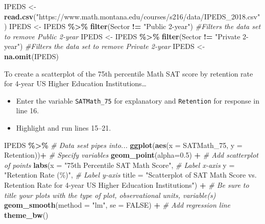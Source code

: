 \documentclass[
]{report}
\newenvironment{Shaded}{\begin{snugshade}}{\end{snugshade}}
\newcommand{\AttributeTok}[1]{\textcolor[rgb]{0.13,0.29,0.53}{#1}}
\newcommand{\CommentTok}[1]{\textcolor[rgb]{0.56,0.35,0.01}{\textit{#1}}}
\newcommand{\ConstantTok}[1]{\textcolor[rgb]{0.56,0.35,0.01}{#1}}
\newcommand{\FloatTok}[1]{\textcolor[rgb]{0.00,0.00,0.81}{#1}}
\newcommand{\FunctionTok}[1]{\textcolor[rgb]{0.13,0.29,0.53}{\textbf{#1}}}
\newcommand{\NormalTok}[1]{#1}
\newcommand{\OtherTok}[1]{\textcolor[rgb]{0.56,0.35,0.01}{#1}}
\newcommand{\SpecialCharTok}[1]{\textcolor[rgb]{0.81,0.36,0.00}{\textbf{#1}}}
\newcommand{\StringTok}[1]{\textcolor[rgb]{0.31,0.60,0.02}{#1}}
\begin{document}
\begin{Shaded}
\begin{Highlighting}[]
\NormalTok{IPEDS }\OtherTok{\textless{}{-}} \FunctionTok{read.csv}\NormalTok{(}\StringTok{"https://www.math.montana.edu/courses/s216/data/IPEDS\_2018.csv"}\NormalTok{) }
\NormalTok{IPEDS }\OtherTok{\textless{}{-}}\NormalTok{ IPEDS }\SpecialCharTok{\%\textgreater{}\%}
  \FunctionTok{filter}\NormalTok{(Sector }\SpecialCharTok{!=} \StringTok{"Public 2{-}year"}\NormalTok{) }\CommentTok{\#Filters the data set to remove Public 2{-}year}
\NormalTok{IPEDS }\OtherTok{\textless{}{-}}\NormalTok{ IPEDS }\SpecialCharTok{\%\textgreater{}\%}
  \FunctionTok{filter}\NormalTok{(Sector }\SpecialCharTok{!=} \StringTok{"Private 2{-}year"}\NormalTok{) }\CommentTok{\#Filters the data set to remove Private 2{-}year}
\NormalTok{IPEDS }\OtherTok{\textless{}{-}} \FunctionTok{na.omit}\NormalTok{(IPEDS)}
\end{Highlighting}
\end{Shaded}

To create a scatterplot of the 75th percentile Math SAT score by retention rate for 4-year US Higher Education Institutions\ldots{}

\begin{itemize}
\item
  Enter the variable \texttt{SATMath\_75} for explanatory and \texttt{Retention} for response in line 16.
\item
  Highlight and run lines 15--21.
\end{itemize}

\begin{Shaded}
\begin{Highlighting}[]
\NormalTok{IPEDS }\SpecialCharTok{\%\textgreater{}\%} \CommentTok{\# Data sest pipes into...}
    \FunctionTok{ggplot}\NormalTok{(}\FunctionTok{aes}\NormalTok{(}\AttributeTok{x =}\NormalTok{ SATMath\_75, }\AttributeTok{y =}\NormalTok{ Retention))}\SpecialCharTok{+}  \CommentTok{\# Specify variables}
    \FunctionTok{geom\_point}\NormalTok{(}\AttributeTok{alpha=}\FloatTok{0.5}\NormalTok{) }\SpecialCharTok{+}  \CommentTok{\# Add scatterplot of points}
    \FunctionTok{labs}\NormalTok{(}\AttributeTok{x =} \StringTok{"75th Percentile SAT Math Score"}\NormalTok{,  }\CommentTok{\# Label x{-}axis}
       \AttributeTok{y =} \StringTok{"Retention Rate (\%)"}\NormalTok{,  }\CommentTok{\# Label y{-}axis}
       \AttributeTok{title =} \StringTok{"Scatterplot of SAT Math Score vs. Retention Rate for }
\StringTok{       4{-}year US Higher Education Institutions"}\NormalTok{) }\SpecialCharTok{+} 
    \CommentTok{\# Be sure to title your plots with the type of plot, observational units, variable(s)}
    \FunctionTok{geom\_smooth}\NormalTok{(}\AttributeTok{method =} \StringTok{"lm"}\NormalTok{, }\AttributeTok{se =} \ConstantTok{FALSE}\NormalTok{) }\SpecialCharTok{+} \CommentTok{\# Add regression line}
    \FunctionTok{theme\_bw}\NormalTok{()}
\end{Highlighting}
\end{Shaded}
\end{document}
